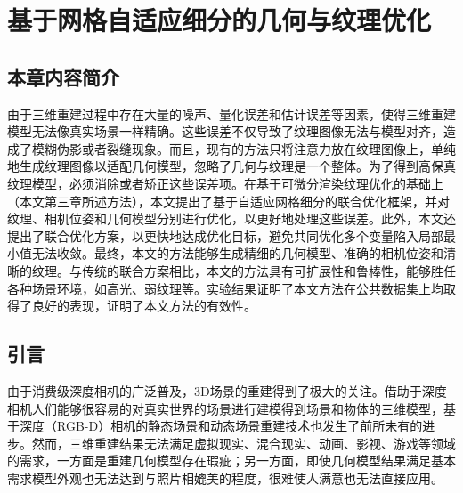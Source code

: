 \setcounter{figure}{0}
\setcounter{table}{0}
\setcounter{algocf}{0}



\chapter{基于网格自适应细分的几何与纹理优化}
\section{本章内容简介}

由于三维重建过程中存在大量的噪声、量化误差和估计误差等因素，使得三维重建模型无法像真实场景一样精确。这些误差不仅导致了纹理图像无法与模型对齐，造成了模糊伪影或者裂缝现象。而且，现有的方法只将注意力放在纹理图像上，单纯地生成纹理图像以适配几何模型，忽略了几何与纹理是一个整体。为了得到高保真纹理模型，必须消除或者矫正这些误差项。在基于可微分渲染纹理优化的基础上（本文第三章所述方法），本文提出了基于自适应网格细分的联合优化框架，并对纹理、相机位姿和几何模型分别进行优化，以更好地处理这些误差。此外，本文还提出了联合优化方案，以更快地达成优化目标，避免共同优化多个变量陷入局部最小值无法收敛。最终，本文的方法能够生成精细的几何模型、准确的相机位姿和清晰的纹理。与传统的联合方案相比，本文的方法具有可扩展性和鲁棒性，能够胜任各种场景环境，如高光、弱纹理等。实验结果证明了本文方法在公共数据集上均取得了良好的表现，证明了本文方法的有效性。



\section{引言}

由于消费级深度相机的广泛普及，3D场景的重建得到了极大的关注。借助于深度相机人们能够很容易的对真实世界的场景进行建模得到场景和物体的三维模型，基于深度（RGB-D）相机的静态场景和动态场景重建技术也发生了前所未有的进步。然而，三维重建结果无法满足虚拟现实、混合现实、动画、影视、游戏等领域的需求，一方面是重建几何模型存在瑕疵；另一方面，即使几何模型结果满足基本需求模型外观也无法达到与照片相媲美的程度，很难使人满意也无法直接应用。\par

